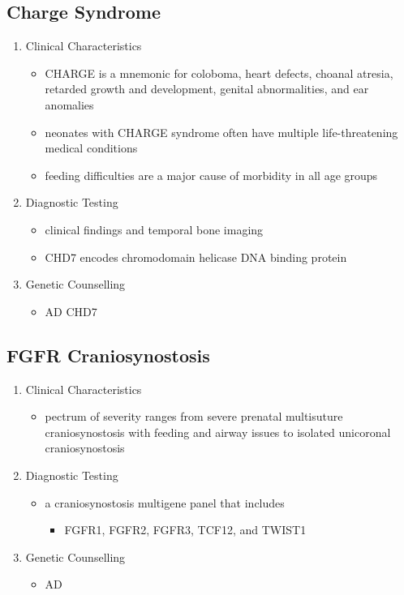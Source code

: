 \documentclass[12pt]{scrartcl}
\begin{document}
\subsection{Charge Syndrome}
\label{sec:orgcb7e30d}
\begin{enumerate}
\item Clinical Characteristics
\label{sec:org42591f1}
\begin{itemize}
\item CHARGE is a mnemonic for coloboma, heart defects, choanal atresia,
retarded growth and development, genital abnormalities, and ear
anomalies
\item neonates with CHARGE syndrome often have multiple life-threatening
medical conditions
\item feeding difficulties are a major cause of
morbidity in all age groups
\end{itemize}
\item Diagnostic Testing
\label{sec:orgd9a63f9}
\begin{itemize}
\item clinical findings and temporal bone imaging
\item CHD7 encodes chromodomain helicase DNA binding protein
\end{itemize}
\item Genetic Counselling
\label{sec:org70df1d2}
\begin{itemize}
\item AD CHD7
\end{itemize}
\end{enumerate}
\subsection{FGFR Craniosynostosis}
\label{sec:orga444cd0}
\begin{enumerate}
\item Clinical Characteristics
\label{sec:orgc1af150}
\begin{itemize}
\item pectrum of severity ranges from severe prenatal multisuture
craniosynostosis with feeding and airway issues to isolated
unicoronal craniosynostosis
\end{itemize}
\item Diagnostic Testing
\label{sec:org65bae37}
\begin{itemize}
\item a craniosynostosis multigene panel that includes
\begin{itemize}
\item FGFR1, FGFR2, FGFR3, TCF12, and TWIST1
\end{itemize}
\end{itemize}
\item Genetic Counselling
\label{sec:org19aa4e6}
\begin{itemize}
\item AD
\end{itemize}
\end{enumerate}
\end{document}
